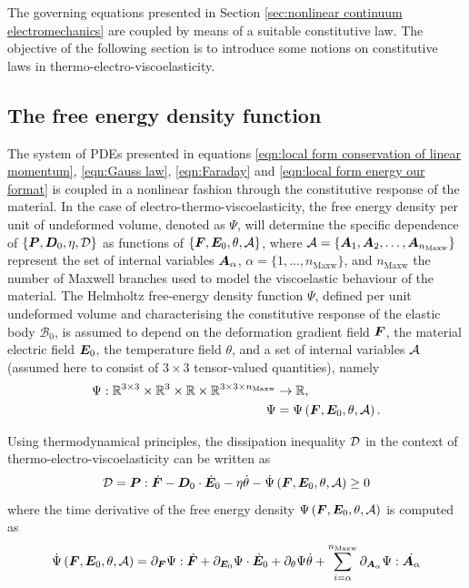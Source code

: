 

The governing equations presented in Section \ref{sec:nonlinear continuum electromechanics} are coupled by means of a suitable constitutive law. 
The objective of the following section is to introduce some notions on  constitutive laws in thermo-electro-viscoelasticity. 


\subsection{The free energy density function}

The system of PDEs presented in equations \eqref{eqn:local form conservation of linear momentum}, \eqref{eqn:Gauss law}, \eqref{eqn:Faraday} and \eqref{eqn:local form energy our format} is coupled in a nonlinear fashion through the constitutive response of the material. In the case of electro-thermo-viscoelasticity, the free energy density per unit of undeformed volume, denoted as $\Psi$, will determine the specific dependence of  $\{\boldsymbol{P},\boldsymbol{D}_0,\eta,\mathcal{D}\}$  as functions of  $\{\boldsymbol{F},\boldsymbol{E}_0,\theta,\mathcal{A}\}$, where $\mathcal{A}=\{\boldsymbol{A}_1,\boldsymbol{A}_2,\dots,\boldsymbol{A}_{n_\text{Maxw}}\}$ represent the set of internal variables $\boldsymbol{A}_{\alpha}$, ${\alpha} = \{1, . . . , n_\text{Maxw}\}$,
and $n_\text{Maxw}$ the number of Maxwell branches used to model the viscoelastic behaviour of the material. 
The Helmholtz free-energy density function $\Psi$, defined per unit
undeformed volume and characterising the constitutive response of the
elastic body $\mathcal{B}_0$, is assumed to depend on the deformation
gradient field $\boldsymbol{F}$, the material electric field $\boldsymbol{E}_0$,
the temperature field $\theta$, and a set of internal variables
$\mathcal{A}$ (assumed here to consist of $3\times3$ tensor-valued quantities),
namely
%
\begin{equation}
	\begin{aligned}
		\Psi:\mathbb{R}^{3\times 3}\times \mathbb{R}^{3}
		\times \mathbb{R}\times \mathbb{R}^{3\times 3 \times n_\text{Maxw}}
		&\rightarrow \mathbb{R},\\
		\Psi &= \Psi\left(\boldsymbol{F},\boldsymbol{E}_0,\theta,\mathcal{A}\right).
	\end{aligned}
\end{equation}
%

Using thermodynamical principles, the dissipation inequality $\mathcal{D}$ in the context of thermo-electro-viscoelasticity can be written as
%
\begin{equation}\label{eqn:disssipation1}
	\mathcal{D} = \boldsymbol{P}:\dot{\boldsymbol{F}} - \boldsymbol{D}_0\cdot \dot{\boldsymbol{E}}_0 - \eta \dot{\theta} - \dot{\Psi}\left(\boldsymbol{F},\boldsymbol{E}_0,\theta,\mathcal{A}\right)\geq 0
\end{equation}
%
where the time derivative of the free energy density ${\Psi}\left(\boldsymbol{F},\boldsymbol{E}_0,\theta,\mathcal{A}\right)$ is computed as 
%
\begin{equation}\label{eqn:disssipation2}
	\dot{\Psi}\left(\boldsymbol{F},\boldsymbol{E}_0,\theta,\mathcal{A}\right)=\partial_{\boldsymbol{F}}\Psi:\dot{\boldsymbol{F}} +
	\partial_{\boldsymbol{E}_0}\Psi\cdot\dot{\boldsymbol{E}}_0 + 
	\partial_{\theta}\Psi \dot{\theta} + 
	\sum_{i={\alpha}}^{n_\text{Maxw}}\partial_{\boldsymbol{A}_{\alpha}}\Psi: \dot{\boldsymbol{A}_{\alpha}}
\end{equation}
%

